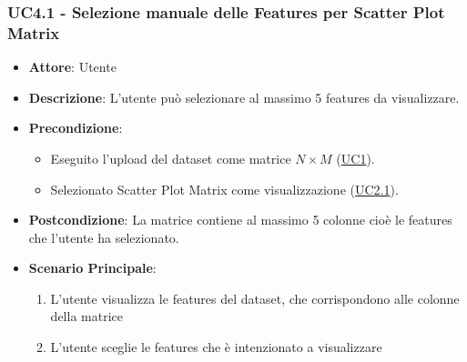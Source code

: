     \subsubsection{UC4.1 - Selezione manuale delle Features per Scatter Plot Matrix}
    \label{uc4.1}
    \begin{itemize}
    \item \textbf{Attore}: Utente
    \item \textbf{Descrizione}: L'utente può selezionare al massimo 5 features da visualizzare.
    \item \textbf{Precondizione}: 
     \begin{itemize}
        \item Eseguito l'upload del dataset come matrice $N\times M$ (\hyperref[uc1]{UC1}).
        \item Selezionato Scatter Plot Matrix come visualizzazione (\hyperref[uc2.1]{UC2.1}).
    \end{itemize}
    \item \textbf{Postcondizione}: La matrice contiene al massimo 5 colonne cioè le features che l'utente ha selezionato.
    \item \textbf{Scenario Principale}: 
    \begin{enumerate}
        \item L'utente visualizza le features del dataset, che corrispondono alle colonne della matrice
        \item L'utente sceglie le features che è intenzionato a visualizzare
    \end{enumerate}  
    \end{itemize}